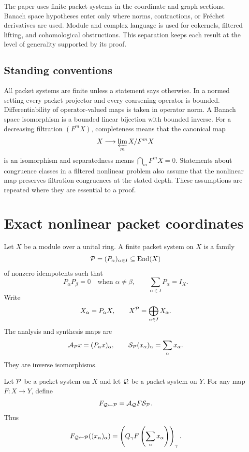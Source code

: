 The paper uses finite packet systems in the coordinate and graph sections.  Banach space hypotheses enter only where norms, contractions, or Fr\'echet derivatives are used.  Module and complex language is used for cokernels, filtered lifting, and cohomological obstructions.  This separation keeps each result at the level of generality supported by its proof.

\subsection*{Standing conventions}
All packet systems are finite unless a statement says otherwise.  In a normed setting every packet projector and every coarsening operator is bounded.  Differentiability of operator-valued maps is taken in operator norm.  A Banach space isomorphism is a bounded linear bijection with bounded inverse.  For a decreasing filtration $(F^mX)$, completeness means that the canonical map
\[
X\longrightarrow\varprojlim_m X/F^mX
\]
is an isomorphism and separatedness means $\bigcap_mF^mX=0$.  Statements about congruence classes in a filtered nonlinear problem also assume that the nonlinear map preserves filtration congruences at the stated depth.  These assumptions are repeated where they are essential to a proof.

\section{Exact nonlinear packet coordinates}\label{sec:nonlinear_coordinates}

Let $X$ be a module over a unital ring.  A finite packet system on $X$ is a family
\[
\mathcal P=(P_\alpha)_{\alpha\in I}\subseteq\operatorname{End}(X)
\]
of nonzero idempotents such that
\[
P_\alpha P_\beta=0
\quad\text{when }\alpha\ne\beta,
\qquad
\sum_{\alpha\in I}P_\alpha=I_X.
\]
Write
\[
X_\alpha=P_\alpha X,
\qquad
X^{\mathcal P}=\bigoplus_{\alpha\in I}X_\alpha.
\]
The analysis and synthesis maps are
\[
\mathcal A_{\mathcal P}x=(P_\alpha x)_\alpha,
\qquad
\mathcal S_{\mathcal P}(x_\alpha)_\alpha=\sum_\alpha x_\alpha.
\]
They are inverse isomorphisms.

\begin{definition}\label{def:nonlinear_packet_map}
Let $\mathcal P$ be a packet system on $X$ and let $\mathcal Q$ be a packet system on $Y$.  For any map $F:X\to Y$, define
\[
F_{\mathcal Q\leftarrow\mathcal P}
=
\mathcal A_{\mathcal Q}F\mathcal S_{\mathcal P}.
\]
Thus
\[
F_{\mathcal Q\leftarrow\mathcal P}((x_\alpha)_\alpha)
=
\left(
Q_\gamma F\left(\sum_\alpha x_\alpha\right)
\right)_\gamma.
\]
\end{definition}

